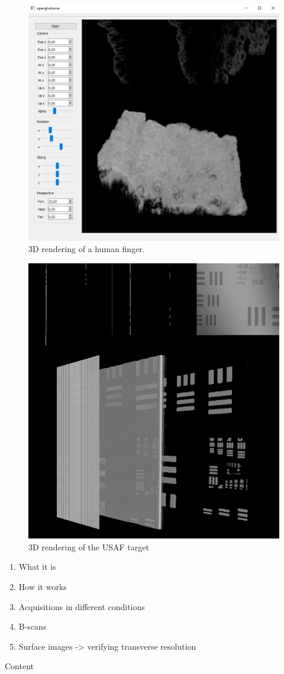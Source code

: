 	\begin{figure}[hbt]
		\centering
		\includegraphics[width=0.8\linewidth]{gfx/3d/dry-orange}
		\caption[]{3D rendering of a human finger.}\label{fig:orange-3d}
	\end{figure}

    \begin{figure}[hbt]
        \centering
        \includegraphics[width=1\linewidth]{gfx/3d/target}
        \caption[]{3D rendering of the USAF target}\label{fig:targer-3d}
    \end{figure}

	\begin{enumerate}
		\item What it is
		\item How it works
		\item Acquisitions in different conditions
		\item B-scans
		\item Surface images -> verifying transverse resolution
	\end{enumerate}

Content
